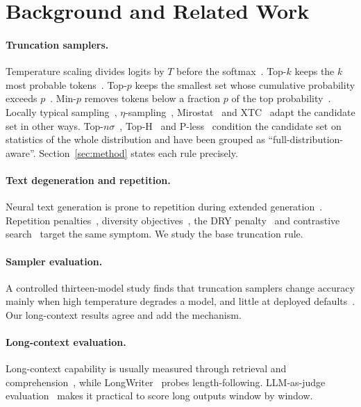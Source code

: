 \documentclass{article}
\begin{document}
\section{Background and Related Work}
\label{sec:related}

\paragraph{Truncation samplers.}
Temperature scaling divides logits by $T$ before the softmax~\citep{ackley1985learning}. Top-$k$ keeps the $k$ most probable tokens~\citep{fan2018hierarchical}. Top-$p$ keeps the smallest set whose cumulative probability exceeds $p$~\citep{holtzman2020curious}. Min-$p$ removes tokens below a fraction $p$ of the top probability~\citep{nguyen2024minp}. Locally typical sampling~\citep{meister2023locally}, $\eta$-sampling~\citep{hewitt2022truncation}, Mirostat~\citep{basu2021mirostat} and XTC~\citep{weidmann2024xtc} adapt the candidate set in other ways. Top-$n\sigma$~\citep{tang2024topnsigma}, Top-H~\citep{baghaei2025toph} and P-less~\citep{tan2025pless} condition the candidate set on statistics of the whole distribution and have been grouped as ``full-distribution-aware''. Section~\ref{sec:method} states each rule precisely.

\paragraph{Text degeneration and repetition.}
Neural text generation is prone to repetition during extended generation~\citep{holtzman2020curious,welleck2020neural,fu2021theoretical}. Repetition penalties~\citep{keskar2019ctrl}, diversity objectives~\citep{li2016diversity}, the DRY penalty~\citep{weidmann2024dry} and contrastive search~\citep{su2022contrastive,su2023contrastive} target the same symptom. We study the base truncation rule.

\paragraph{Sampler evaluation.}
A controlled thirteen-model study finds that truncation samplers change accuracy mainly when high temperature degrades a model, and little at deployed defaults~\citep{larosa2026fragility}. Our long-context results agree and add the mechanism.

\paragraph{Long-context evaluation.}
Long-context capability is usually measured through retrieval and comprehension~\citep{bai2024longbench,hsieh2024ruler,shaham2023zeroscrolls}, while LongWriter~\citep{bai2025longwriter} probes length-following. LLM-as-judge evaluation~\citep{zheng2023judging,li2024generative} makes it practical to score long outputs window by window.
\end{document}

